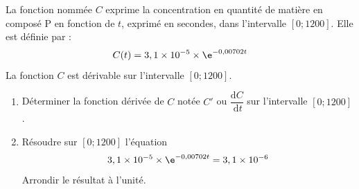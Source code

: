 La fonction nommée $C$ exprime la concentration en quantité de matière en composé P en fonction de $t$, exprimé en secondes, dans l'intervalle $[0 ; 1200]$. Elle est définie par :
\[C(t)=3,1 \times 10^{-5} \times \e^{-0,00702 t}\]
La fonction $C$ est dérivable sur l'intervalle $[0 ; 1200]$.
\begin{enumerate}[start=7]
	\item Déterminer la fonction dérivée de $C$ notée $C'$ ou $\dfrac{\mathrm{d} C}{\mathrm{~d} t}$ sur l'intervalle $[0; 1200]$.

	\item Résoudre sur $[0 ; 1200]$ l'équation
	\[3,1 \times 10^{-5} \times \e^{-0,00702 t}=3,1 \times 10^{-6}\]
	Arrondir le résultat à l'unité.
\end{enumerate}



